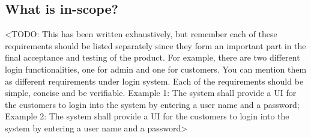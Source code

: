 \documentclass{report}
\begin{document}
\subsection{What is in-scope?}
<TODO: This has been written exhaustively, but remember each of these requirements should be listed separately since they form an important part in the final acceptance and testing of the product. For example, there are two different login functionalities, one for admin and one for customers. You can mention them as different requirements under login system. Each of the requirements should be simple, concise and be verifiable. Example 1: The system shall provide a UI for the customers to login into the system by entering a user name and a password; Example 2: The system shall provide a UI for the customers to login into the system by entering a user name and a password>
\end{document}
